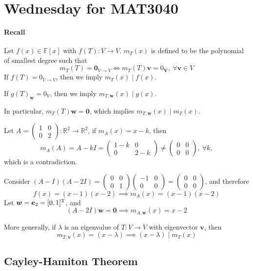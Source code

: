 
\section{Wednesday for MAT3040}
\paragraph{Recall}
Let $f(x)\in\mathbb{F}[x]$ with $f(T):V\to V$.
$m_T(x)$ is defined to be the polynomial of smallest degree such that
\[
m_T(T)=\bm0_{V\to V}\Longleftrightarrow
m_T(T)\bm v=0_{\bm V}, \ \forall\bm v\in V
\]
If $f(T) = 0_{V\to V}$, then we imply $m_T(x)\mid f(x)$.

If $g(T)_{\bm w}=0_V$, then we imply $m_{T,\bm w}(x)\mid g(x)$.

In particular, $m_T(T)\bm w=\bm0$, which implies $m_{T,\bm w}(x)\mid m_T(x)$.

\begin{example}
Let $A=\begin{pmatrix}
1&0\\0&2
\end{pmatrix}:\mathbb{R}^2\to\mathbb{R}^2$, if $m_A(x) = x-k$, then
\[
m_A(A) = A - kI=\begin{pmatrix}
1-k&0\\0&2-k
\end{pmatrix}\ne\begin{pmatrix}
0&0\\0&0
\end{pmatrix},\ \forall k,
\]
which is a contradiction.

Consider $(A-I)(A-2I)=\begin{pmatrix}
0&0\\0&1
\end{pmatrix}\begin{pmatrix}
-1&0\\0&0
\end{pmatrix}=\begin{pmatrix}
0&0\\0&0
\end{pmatrix}$, and therefore
\[
f(x)= (x-1)(x-2)\implies
m_A(x) = (x-1)(x-2)
\]
Let $\bm w = \bm e_2 = [0,1]^{\mathrm T}$, and 
\[
(A-2I)\bm w=\bm0\implies
m_{A,\bm w}(x) = x-2
\]
\end{example}
More generally, if $\lambda$ is an eigenvalue of $T:V\to V$ with eigenvector $\bm v$, then
\[
m_{T,\bm v}(x) =  (x-\lambda)\implies
(x-\lambda)\mid m_T(x)
\]


\subsection{Cayley-Hamiton Theorem}

